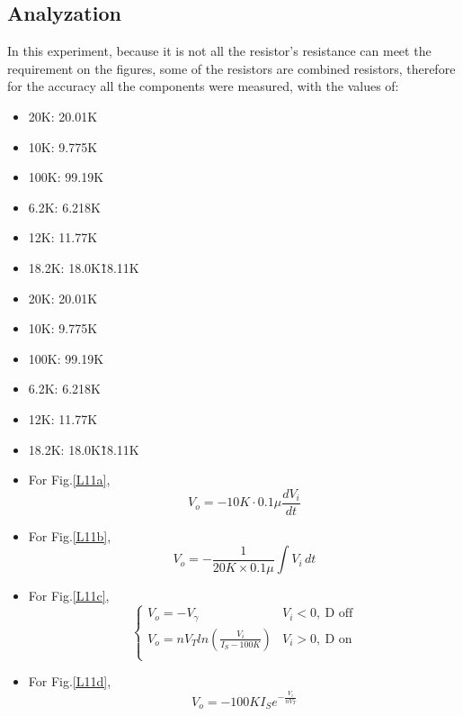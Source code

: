    \subsection{Analyzation}
    In this experiment, because it is not all the resistor's resistance can meet the requirement on the figures, some of the resistors are combined resistors, therefore for the accuracy all the components were measured, with the values of:
    \begin{itemize}
        \item 20K: 20.01K
        \item 10K: 9.775K
        \item 100K: 99.19K
        \item 6.2K: 6.218K
        \item 12K: 11.77K
        \item 18.2K: 18.0K\~18.11K
    \end{itemize}
    \begin{itemize}
        \item 20K: 20.01K
        \item 10K: 9.775K
        \item 100K: 99.19K
        \item 6.2K: 6.218K
        \item 12K: 11.77K
        \item 18.2K: 18.0K\~18.11K
    \end{itemize}
    \begin{itemize}
        \item For Fig.\ref{L11a},
            \begin{equation}
                V_o=-10K\cdot0.1\mu\frac{dV_i}{dt}
            \end{equation}
        \item For Fig.\ref{L11b},
            \begin{equation}
                V_o=-\frac{1}{20K\times0.1\mu}\int V_i \,dt
            \end{equation}
        \item For Fig.\ref{L11c},
            \begin{equation}
                \begin{cases}
                    V_o=-V_\gamma & V_i<0,~\text{D off}\\
                    V_o=nV_Tln(\frac{V_i}{I_S-100K}) & V_i>0,~\text{D on}\\
                \end{cases}
            \end{equation}
        \item For Fig.\ref{L11d},
            \begin{equation}
                V_o=-100KI_Se^{-\frac{V_i}{nV_T}}
            \end{equation}
    \end{itemize}
    
